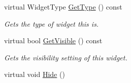 \begin{DoxyCompactItemize}
virtual WidgetType \hyperlink{classMezzanine_1_1UI_1_1Widget_a9e1a01dc48630ce92e617cc0c6e9d31a}{GetType} () const 
\begin{DoxyCompactList}\small\item\em Gets the type of widget this is. \item\end{DoxyCompactList}\item 
virtual bool \hyperlink{classMezzanine_1_1UI_1_1Widget_a2f4a364179d378fded57418571cdcfd0}{GetVisible} () const 
\begin{DoxyCompactList}\small\item\em Gets the visibility setting of this widget. \item\end{DoxyCompactList}\item 
\hypertarget{classMezzanine_1_1UI_1_1Widget_ad6575e6720477274153924b316e5b1d4}{
virtual void \hyperlink{classMezzanine_1_1UI_1_1Widget_ad6575e6720477274153924b316e5b1d4}{Hide} ()}
\label{classMezzanine_1_1UI_1_1Widget_ad6575e6720477274153924b316e5b1d4}


\end{DoxyCompactItemize}
